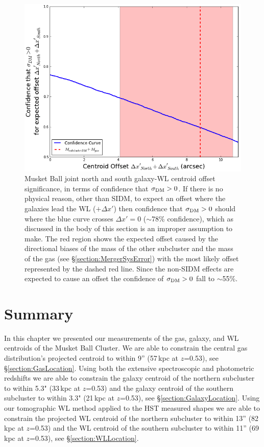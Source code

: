 \begin{figure}
\centering
\includegraphics[width=5in]{Chapter4/AnalysisFiles/NorthSouthJointAnalysis_delxPC.png}
\caption[Musket Ball joint northern and southern subcluster galaxy and weak lensing centroid offset significance.]{
Musket Ball joint north and south galaxy-WL centroid offset significance, in terms of confidence that $\sigma_{\rm DM}>0$.
If there is no physical reason, other than SIDM, to expect an offset where the galaxies lead the WL ($+\Delta x'$) then confidence that $\sigma_{\rm DM}>0$ should where the blue curve crosses $\Delta x'=0$ ($\sim$78\% confidence), which as discussed in the body of this section is an improper assumption to make.
The red region shows the expected offset caused by the directional biases of the mass of the other subcluster and the mass of the gas (see \S\ref{section:MergerSysError}) with the most likely offset represented by the dashed red line.
Since the non-SIDM effects are expected to cause an offset the confidence of $\sigma_{\rm DM}>0$ fall to $\sim$55\%.
}
\label{figure:CentroidSignificance_NorthPlusSouth}
\end{figure}

\section{Summary}

In this chapter we presented our measurements of the gas, galaxy, and WL centroids of the Musket Ball Cluster.
We are able to constrain the central gas distribution's projected centroid to within 9'' (57\,kpc at $z$=0.53), see \S\ref{section:GasLocation}.
Using both the extensive spectroscopic and photometric redshifts we are able to constrain the galaxy centroid of the northern subcluster to within 5.3" (33\,kpc at $z$=0.53) and the galaxy centroid of the southern subcluster to within 3.3" (21\,kpc at $z$=0.53), see \S\ref{section:GalaxyLocation}.
Using our tomographic WL method applied to the HST measured shapes we are able to constrain the projected WL centroid of the northern subcluster to within 13'' (82\,kpc at $z$=0.53) and the WL centroid of the southern subcluster to within 11'' (69\,kpc at $z$=0.53), see \S\ref{section:WLLocation}.

